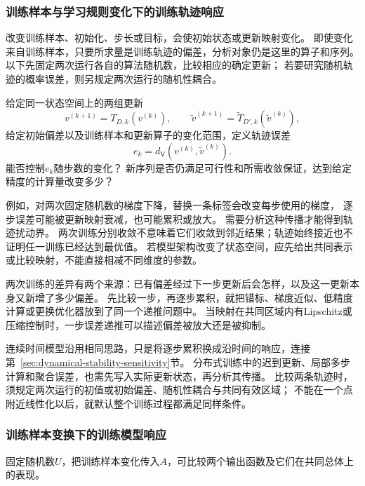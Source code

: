 \subsubsection{训练样本与学习规则变化下的训练轨迹响应}
\label{sec:future-analysis-iteration-perturbation}

改变训练样本、初始化、步长或目标，会使初始状态或更新映射变化。
即使变化来自训练样本，只要所求量是训练轨迹的偏差，分析对象仍是这里的算子和序列。
以下先固定两次运行各自的算法随机数，比较相应的确定更新；
若要研究随机轨迹的概率误差，则另规定两次运行的随机性耦合。

\begin{mathproblem}[训练轨迹对训练样本和学习规则的响应]
  \label{question:future-iteration-perturbation}
  给定同一状态空间上的两组更新
  \[
    v^{(k+1)}=T_{D,k}(v^{(k)}),\qquad
    \widetilde v^{(k+1)}=\widetilde T_{D',k}(\widetilde v^{(k)}),
  \]
  给定初始偏差以及训练样本和更新算子的变化范围，定义轨迹误差
  \[
    e_k=d_{\mathsf V}(v^{(k)},\widetilde v^{(k)}).
  \]
  能否控制$e_k$随步数的变化？
  新序列是否仍满足可行性和所需收敛保证，达到给定精度的计算量改变多少？
\end{mathproblem}

例如，对两次固定随机数的梯度下降，替换一条标签会改变每步使用的梯度，
逐步误差可能被更新映射衰减，也可能累积或放大。
需要分析这种传播才能得到轨迹扰动界。
两次训练分别收敛不意味着它们收敛到邻近结果；轨迹始终接近也不证明任一训练已经达到最优值。
若模型架构改变了状态空间，应先给出共同表示或比较映射，不能直接相减不同维度的参数。

两次训练的差异有两个来源：已有偏差经过下一步更新后会怎样，以及这一更新本身又新增了多少偏差。
先比较一步，再逐步累积，就把错标、梯度近似、低精度计算或更换优化器放到了同一个递推问题中。
当映射在共同区域内有Lipschitz或压缩控制时，一步误差递推可以描述偏差被放大还是被抑制。

连续时间模型沿用相同思路，只是将逐步累积换成沿时间的响应，连接第~\ref{sec:dynamical-stability-sensitivity}节。
分布式训练中的迟到更新、局部多步计算和聚合误差，也需先写入实际更新状态，再分析其传播。
比较两条轨迹时，须规定两次运行的初值或初始偏差、随机性耦合与共同有效区域；
不能在一个点附近线性化以后，就默认整个训练过程都满足同样条件。

\subsubsection{训练样本变换下的训练模型响应}
\label{sec:future-analysis-perturbation-map}

固定随机数$U$，把训练样本变化传入$A$，可比较两个输出函数及它们在共同总体上的表现。

